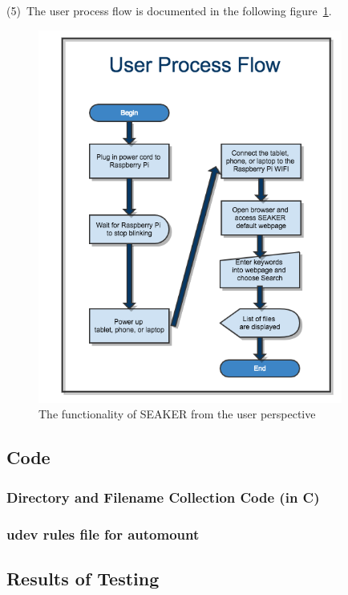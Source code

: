 \documentclass[12pt]{article}
\begin{document}
(5)~The user process flow is documented in the following
figure~\ref{fig:user_process_flow}.

\begin{figure}[H]
  \begin{center}
  \includegraphics[width=10cm]{images/UserProcessFlow.png}
  \caption{The functionality of SEAKER from the user perspective}
  \label{fig:user_process_flow}
  \end{center}
\end{figure}

\newpage
\subsection{Code}
\subsubsection{Directory and Filename Collection Code (in C)}

\label{lst:CollectionCode}

\newpage
\subsubsection{udev rules file for automount}

\label{lst:udevRules}

\newpage
\subsection{Results of Testing}
\end{document}
